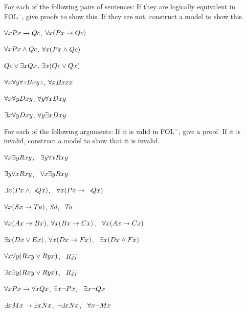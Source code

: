 \solutions
\problempart
\label{pr.FOL$^=$equivornot}
For each of the following pairs of sentences: If they are logically equivalent in FOL$^=$, give proofs to show this. If they are not, construct a model to show this.
\begin{earg}
\item $\forall x Px \rightarrow Qc$, $\forall x (Px \rightarrow Qc)$
\item $\forall x Px \wedge Qc$, $\forall x (Px \wedge Qc)$
\item $Qc \vee \exists x Qx$, $\exists x (Qc \vee Qx)$
\item $\forall x\forall y \forall z Bxyz$, $\forall x Bxxx$
\item $\forall x\forall y Dxy$, $\forall y\forall x Dxy$
\item $\exists x\forall y Dxy$, $\forall y\exists x Dxy$
\end{earg}

\solutions
\problempart
\label{pr.FOL$^=$validornot}
For each of the following arguments: If it is valid in FOL$^=$, give a proof. If it is invalid, construct a model to show that it is invalid.
\begin{earg}
\item $\forall x\exists y Rxy$, \therefore\ $\exists y\forall x Rxy$
\item $\exists y\forall x Rxy$, \therefore\ $\forall x\exists y Rxy$
\item $\exists x(Px \wedge \neg Qx)$, \therefore\ $\forall x(Px \rightarrow \neg Qx)$
\item $\forall x(Sx \rightarrow Ta)$, $Sd$, \therefore\ $Ta$
\item $\forall x(Ax\rightarrow Bx)$, $\forall x(Bx \rightarrow Cx)$, \therefore\ $\forall x(Ax \rightarrow Cx)$
\item $\exists x(Dx \vee Ex)$, $\forall x(Dx \rightarrow Fx)$, \therefore\ $\exists x(Dx \wedge Fx)$
\item $\forall x\forall y(Rxy \vee Ryx)$, \therefore\ $Rjj$
\item $\exists x\exists y(Rxy \vee Ryx)$, \therefore\ $Rjj$
\item $\forall x Px \rightarrow \forall x Qx$, $\exists x \neg Px$, \therefore\ $\exists x \neg Qx$
\item $\exists x Mx \rightarrow \exists x Nx$, $\neg \exists x Nx$, \therefore\ $\forall x \neg Mx$
\end{earg}

